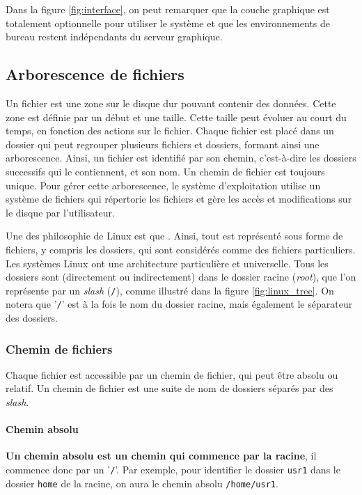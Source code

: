  Dans la figure \ref{fig:interface}, on peut remarquer que la couche graphique est totalement optionnelle pour utiliser le système et que les environnements de bureau restent indépendants du serveur graphique.

\newpage

\subsection{Arborescence de fichiers} \label{sec:directories}
Un fichier est une zone sur le disque dur pouvant contenir des données. Cette zone est définie par un début et une taille. Cette taille peut évoluer au court du temps, en fonction des actions sur le fichier. Chaque fichier est placé dans un dossier qui peut regrouper plusieurs fichiers et dossiers, formant ainsi une arborescence. Ainsi, un fichier est identifié par son chemin, c'est-à-dire les dossiers successifs qui le contiennent, et son nom. Un chemin de fichier est toujours unique. Pour gérer cette arborescence, le système d'exploitation utilise un système de fichiers qui répertorie les fichiers et gère les accès et modifications sur le disque par l'utilisateur.

Une des philosophie de Linux est que \textbf{}. Ainsi, tout est représenté sous forme de fichiers, y compris les dossiers, qui sont considérés comme des fichiers particuliers. Les systèmes Linux ont une architecture particulière et universelle. Tous les dossiers sont (directement ou indirectement) dans le dossier racine (\textit{root}), que l'on représente par un \textit{slash} (\texttt{/}), comme illustré dans la figure \ref{fig:linux_tree}. On notera que '\texttt{/}' est à la fois le nom du dossier racine, mais également le séparateur des dossiers.

\subsubsection{Chemin de fichiers}

Chaque fichier est accessible par un chemin de fichier, qui peut être absolu ou relatif. Un chemin de fichier est une suite de nom de dossiers séparés par des \textit{slash}.

\paragraph{Chemin absolu}

\textbf{Un chemin absolu est un chemin qui commence par la racine}, il commence donc par un '\texttt{/}'. Par exemple, pour identifier le dossier \texttt{usr1} dans le dossier \texttt{home} de la racine, on aura le chemin absolu \texttt{/home/usr1}.

